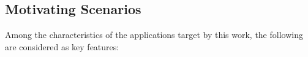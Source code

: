 



\subsection{Motivating Scenarios}\label{sec:motivating}

Among the characteristics of the applications target by this work, the following are considered as key features:

